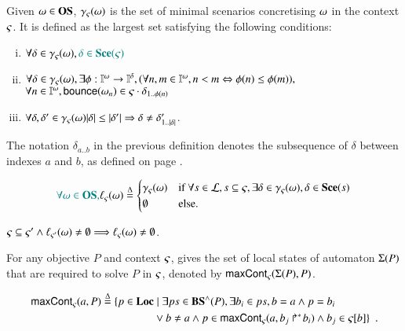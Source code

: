 \begin{definition}[$\concr: \OS \to \powerset(\Sce)$]\label{def:concr}
Given $\omega\in\mathbf{OS}$, $\gamma_\varsigma(\omega)$ is the set of minimal scenarios concretising $\omega$ in the
context $\varsigma$. It is defined as the largest set satisfying the following conditions:
\begin{enumerate}[(i)]
\item $\forall\delta\in\gamma_\varsigma(\omega), \textcolor{teal}{\delta\in\mathbf{Sce}(\varsigma)}$
\item $\forall\delta\in\gamma_\varsigma(\omega),
  \exists \phi:\mathbb{I}^{\omega}\to\mathbb{I}^{\delta},
    (\forall n,m\in\mathbb{I}^{\omega}, n<m \Leftrightarrow \phi(n)\leq\phi(m)),$
\\\hspace*{2cm}$\forall n\in\mathbb{I}^{\omega}, \mathsf{bounce}(\omega_n) \in \varsigma\cdot\delta_{1..\phi(n)}$
\item $\forall\delta,\delta'\in\gamma_\varsigma(\omega)
				|\delta|\leq|\delta'| \Rightarrow
					\delta\neq\delta'_{1..|\delta|}$.
\end{enumerate}
\end{definition}

\noindent
The notation $\delta_{a..b}$ in the previous definition
denotes the subsequence of $\delta$ between indexes $a$ and $b$,
as defined on page \pageref{notations}.

\begin{definition}[$\uconcr: \OS \rightarrow \powerset(\Sce)$]
\label{def:uconcr}
  \[
  \textcolor{teal}{\forall \omega \in \mathbf{OS},}
  \ell_\varsigma(\omega) \stackrel{\Delta}=
  \begin{cases}
    \gamma_\varsigma(\omega) & \text{if } \forall s \in \mathcal{L}, s \subseteq \varsigma, \exists \delta \in \gamma_\varsigma(\omega), \delta \in \mathbf{Sce}(s) \\
    \emptyset & \text{else.}
  \end{cases}
  \]
\end{definition}
% 
\begin{lemma}
\label{lem:uconcr-ctx}
  $\varsigma \subseteq \varsigma' \wedge \ell_{\varsigma'}(\omega) \neq \emptyset \Longrightarrow \ell_{\varsigma}(\omega) \neq \emptyset$.
\end{lemma}

For any objective $P$ and context $\varsigma$,  gives the set of local states of automaton $\Sigma(P)$ that are required to solve $P$ in $\varsigma$, denoted by $\mathsf{maxCont}_\varsigma(\Sigma(P), P)$.
\begin{definition}[$\gCont_\ctx : \Sigma \times \Obj \rightarrow \powerset(\PHproc)$]
  \label{def:maxCont}
  \begin{align*}
    \mathsf{maxCont}_\varsigma(a,P) \stackrel{\Delta}=
    \{ p \in \mathbf{Loc} &\mid \exists ps \in \mathbf{BS}^\wedge(P), \exists b_i \in ps, b = a \wedge p = b_i \\
      & \vee b \neq a \wedge p \in \mathsf{maxCont}_\varsigma(a, \mbox{$b_j\Rsh^*\!b_i$}) \wedge b_j \in {\varsigma[b]} \}
    \enspace.
  \end{align*}
\end{definition}

